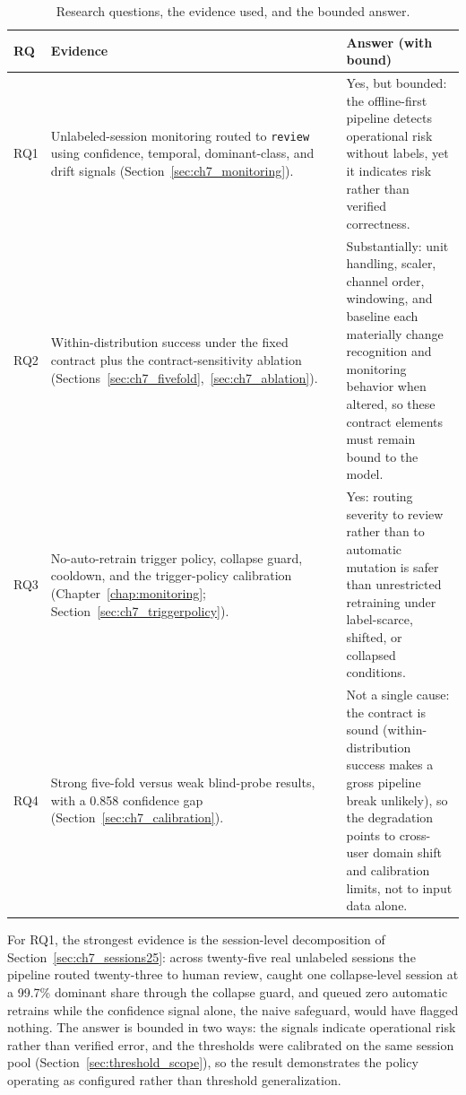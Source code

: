 \renewcommand{\arraystretch}{1.3}
\begin{table}[htbp]
\centering
\footnotesize
\caption[Research questions, the evidence used, and the bounded answer.]{Research questions, the evidence used, and the bounded answer.}
\label{tab:ch8_rq}
\begin{tabularx}{\textwidth}{p{0.7cm} X X}
\toprule
\textbf{RQ} & \textbf{Evidence} & \textbf{Answer (with bound)} \\
\midrule
RQ1 & Unlabeled-session monitoring routed to \texttt{review} using confidence, temporal, dominant-class, and drift signals (Section~\ref{sec:ch7_monitoring}). & Yes, but bounded: the offline-first pipeline detects operational risk without labels, yet it indicates risk rather than verified correctness. \\
RQ2 & Within-distribution success under the fixed contract plus the contract-sensitivity ablation (Sections~\ref{sec:ch7_fivefold},~\ref{sec:ch7_ablation}). & Substantially: unit handling, scaler, channel order, windowing, and baseline each materially change recognition and monitoring behavior when altered, so these contract elements must remain bound to the model. \\
RQ3 & No-auto-retrain trigger policy, collapse guard, cooldown, and the trigger-policy calibration (Chapter~\ref{chap:monitoring}; Section~\ref{sec:ch7_triggerpolicy}). & Yes: routing severity to review rather than to automatic mutation is safer than unrestricted retraining under label-scarce, shifted, or collapsed conditions. \\
RQ4 & Strong five-fold versus weak blind-probe results, with a 0.858 confidence gap (Section~\ref{sec:ch7_calibration}). & Not a single cause: the contract is sound (within-distribution success makes a gross pipeline break unlikely), so the degradation points to cross-user domain shift and calibration limits, not to input data alone. \\
\bottomrule
\end{tabularx}
\renewcommand{\arraystretch}{1.0}
\end{table}

For RQ1, the strongest evidence is the session-level decomposition of Section~\ref{sec:ch7_sessions25}: across twenty-five real unlabeled sessions the pipeline routed twenty-three to human review, caught one collapse-level session at a 99.7\% dominant share through the collapse guard, and queued zero automatic retrains while the confidence signal alone, the naive safeguard, would have flagged nothing. The answer is bounded in two ways: the signals indicate operational risk rather than verified error, and the thresholds were calibrated on the same session pool (Section~\ref{sec:threshold_scope}), so the result demonstrates the policy operating as configured rather than threshold generalization.

